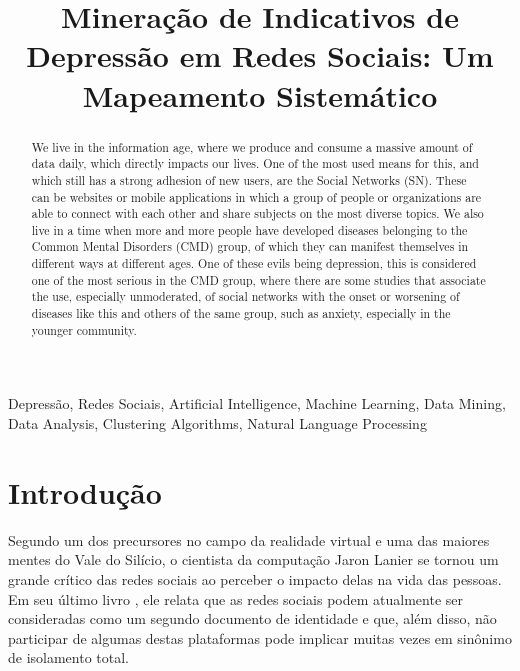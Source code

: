 \documentclass[conference]{IEEEtran}
\begin{document}
\title{Mineração de Indicativos de Depressão em Redes Sociais: Um Mapeamento Sistemático}

\author{
    \and 
}

\maketitle

\begin{abstract}
We live in the information age, where we produce and consume a massive amount of data daily, which directly impacts our lives. One of the most used means for this, and which still has a strong adhesion of new users, are the Social Networks (SN). These can be websites or mobile applications in which a group of people or organizations are able to connect with each other and share subjects on the most diverse topics. We also live in a time when more and more people have developed diseases belonging to the Common Mental Disorders (CMD) group, of which they can manifest themselves in different ways at different ages. One of these evils being depression, this is considered one of the most serious in the CMD group, where there are some studies that associate the use, especially unmoderated, of social networks with the onset or worsening of diseases like this and others of the same group, such as anxiety, especially in the younger community.
\end{abstract}

\begin{IEEEkeywords}
Depressão, Redes Sociais, Artificial Intelligence, Machine Learning, Data Mining, Data Analysis, Clustering Algorithms, Natural Language Processing
\end{IEEEkeywords}

\section{Introdução}
Segundo um dos precursores no campo da realidade virtual e uma das maiores mentes do Vale do Silício, o cientista da computação Jaron Lanier se tornou um grande crítico das redes sociais ao perceber o impacto delas na vida das pessoas. Em seu último livro \cite{JaronLanier}, ele relata que as redes sociais podem atualmente ser consideradas como um segundo documento de identidade e que, além disso, não participar de algumas destas plataformas pode implicar muitas vezes em sinônimo de isolamento total.
\end{document}
